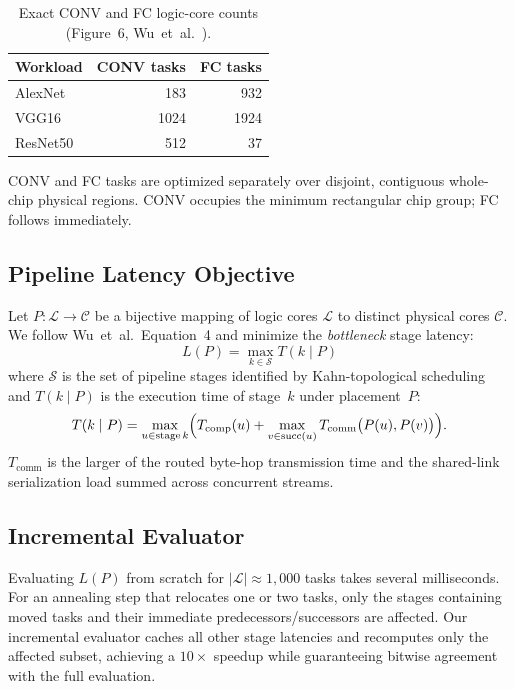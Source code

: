 \documentclass[10pt,conference]{IEEEtran}
\begin{document}
\begin{table}[htbp]
  \caption{Exact CONV and FC logic-core counts (Figure~6,
           Wu~et~al.~\cite{wu2020todaes}).}
  \label{tab:workloads}
  \centering
  \begin{tabular}{lrr}
    \toprule
    Workload & CONV tasks & FC tasks \\
    \midrule
    AlexNet  & 183 & 932 \\
    VGG16    & 1024 & 1924 \\
    ResNet50 & 512 & 37 \\
    \bottomrule
  \end{tabular}
\end{table}

CONV and FC tasks are optimized separately over disjoint, contiguous
whole-chip physical regions.  CONV occupies the minimum rectangular chip
group; FC follows immediately.

\subsection{Pipeline Latency Objective}

Let $P : \mathcal{L} \to \mathcal{C}$ be a bijective mapping of logic cores
$\mathcal{L}$ to distinct physical cores $\mathcal{C}$.  We follow
Wu~et~al.~Equation~4 and minimize the \emph{bottleneck} stage latency:
\begin{equation}
  L(P) = \max_{k \in \mathcal{S}} T(k \mid P)
  \label{eq:objective}
\end{equation}
where $\mathcal{S}$ is the set of pipeline stages identified by
Kahn-topological scheduling and $T(k \mid P)$ is the execution time of
stage~$k$ under placement~$P$:
\begin{equation}
  T(k \mid P) = \max_{u \in \text{stage}\,k}
    \Bigl( T_{\text{comp}}(u) + \max_{v \in \text{succ}(u)}
    T_{\text{comm}}\bigl(P(u), P(v)\bigr) \Bigr).
  \label{eq:stage}
\end{equation}
$T_{\text{comm}}$ is the larger of the routed byte-hop transmission time
and the shared-link serialization load summed across concurrent streams.

\subsection{Incremental Evaluator}

Evaluating $L(P)$ from scratch for $|\mathcal{L}| \approx 1{,}000$ tasks
takes several milliseconds.  For an annealing step that relocates one or two
tasks, only the stages containing moved tasks and their immediate
predecessors/successors are affected.  Our incremental evaluator caches all
other stage latencies and recomputes only the affected subset, achieving a
$10\times$ speedup while guaranteeing bitwise agreement with the full
evaluation.
\end{document}
